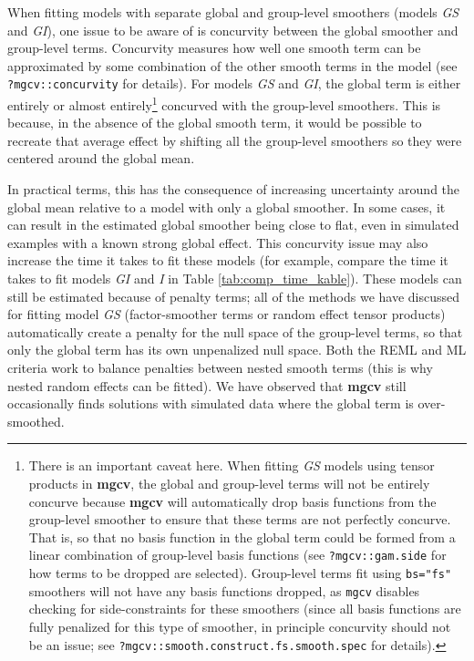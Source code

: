 \documentclass[12pt]{article}
\let\rmarkdownfootnote\footnote%
\def\footnote{\protect\rmarkdownfootnote}
\begin{document}
When fitting models with separate global and group-level smoothers
(models \emph{GS} and \emph{GI}), one issue to be aware of is concurvity
between the global smoother and group-level terms. Concurvity measures
how well one smooth term can be approximated by some combination of the
other smooth terms in the model (see \texttt{?mgcv::concurvity} for
details). For models \emph{GS} and \emph{GI}, the global term is either
entirely or almost entirely\footnote{There is an important caveat here.
  When fitting \emph{GS} models using tensor products in \textbf{mgcv},
  the global and group-level terms will not be entirely concurve because
  \textbf{mgcv} will automatically drop basis functions from the
  group-level smoother to ensure that these terms are not perfectly
  concurve. That is, so that no basis function in the global term could
  be formed from a linear combination of group-level basis functions
  (see \texttt{?mgcv::gam.side} for how terms to be dropped are
  selected). Group-level terms fit using \texttt{bs="fs"} smoothers will
  not have any basis functions dropped, as \texttt{mgcv} disables
  checking for side-constraints for these smoothers (since all basis
  functions are fully penalized for this type of smoother, in principle
  concurvity should not be an issue; see
  \texttt{?mgcv::smooth.construct.fs.smooth.spec} for details).}
concurved with the group-level smoothers. This is because, in the
absence of the global smooth term, it would be possible to recreate that
average effect by shifting all the group-level smoothers so they were
centered around the global mean.

In practical terms, this has the consequence of increasing uncertainty
around the global mean relative to a model with only a global smoother.
In some cases, it can result in the estimated global smoother being
close to flat, even in simulated examples with a known strong global
effect. This concurvity issue may also increase the time it takes to fit
these models (for example, compare the time it takes to fit models
\emph{GI} and \emph{I} in Table \ref{tab:comp_time_kable}). These models
can still be estimated because of penalty terms; all of the methods we
have discussed for fitting model \emph{GS} (factor-smoother terms or
random effect tensor products) automatically create a penalty for the
null space of the group-level terms, so that only the global term has
its own unpenalized null space. Both the REML and ML criteria work to
balance penalties between nested smooth terms (this is why nested random
effects can be fitted). We have observed that \textbf{mgcv} still
occasionally finds solutions with simulated data where the global term
is over-smoothed.
\end{document}
